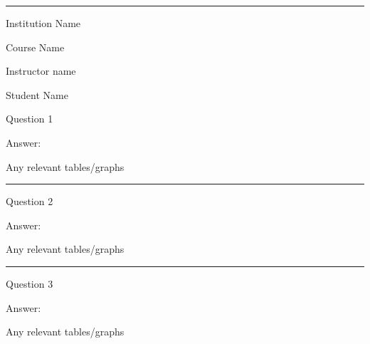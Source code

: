 \documentclass[11pt,]{article}
\begin{document}
\begin{center}\rule{0.5\linewidth}{0.5pt}\end{center}

Institution Name

Course Name

Instructor name

Student Name

Question 1

Answer:

Any relevant tables/graphs

\begin{center}\rule{0.5\linewidth}{0.5pt}\end{center}

Question 2

Answer:

Any relevant tables/graphs

\begin{center}\rule{0.5\linewidth}{0.5pt}\end{center}

Question 3

Answer:

Any relevant tables/graphs
\end{document}
